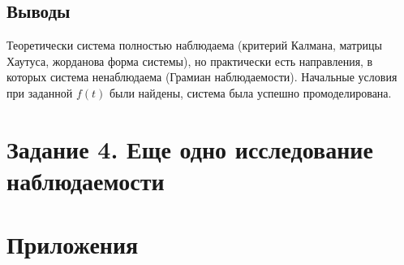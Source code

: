 \documentclass[a4paper, 12pt]{article}
\begin{document}
    \subsection{Выводы}
    Теоретически система полностью наблюдаема (критерий Калмана, матрицы Хаутуса, жорданова форма системы), но практически есть направления, в которых система ненаблюдаема (Грамиан наблюдаемости).
    Начальные условия при заданной $f(t)$ были найдены, система была успешно промоделирована.


    \section{Задание 4. Еще одно исследование наблюдаемости}


    \section{Приложения}
\end{document}
